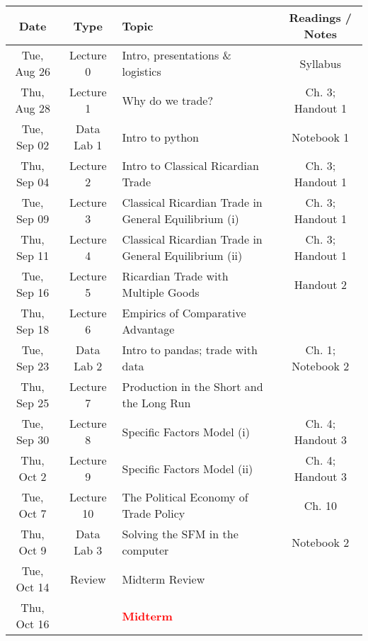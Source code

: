 \documentclass[11pt]{article}
\begin{document}
\medskip
\begin{center}
\begin{tabular}{|c|c|l|c|}
\hline \textbf{Date} & \textbf{Type} & \textbf{Topic} & \textbf{Readings / Notes} \\ \hline
			
		Tue, Aug 26 & Lecture 0 & Intro, presentations \& logistics & Syllabus \\ \hline
		Thu, Aug 28 & Lecture 1  & Why do we trade? & Ch. 3; Handout 1 \\ \hline
		Tue, Sep 02 & Data Lab 1 & Intro to python & Notebook 1 \\ \hline
	    Thu, Sep 04 &Lecture 2 & Intro to Classical Ricardian Trade & Ch. 3; Handout 1 \\ \hline	
		Tue, Sep 09 & Lecture 3 & Classical Ricardian Trade in General Equilibrium (i) & Ch. 3; Handout 1 \\ \hline
		Thu, Sep 11 & Lecture 4 & Classical Ricardian Trade in General Equilibrium (ii) & Ch. 3; Handout 1 \\ \hline
		Tue, Sep 16 & Lecture 5 & Ricardian Trade with Multiple Goods & Handout 2 \\ \hline
		
		Thu, Sep 18 & Lecture 6 & Empirics of Comparative Advantage &  \textemdash  \\ \hline

		Tue, Sep 23 & Data Lab 2 & Intro to pandas; trade with data & Ch. 1; Notebook 2 \\ \hline

  	Thu, Sep 25 &  Lecture 7 & Production in the Short and the Long Run & \textemdash \\ \hline

        Tue, Sep 30 &  Lecture 8 & Specific Factors Model (i) & Ch. 4; Handout 3  \\ \hline

        Thu, Oct 2 &  Lecture 9 & Specific Factors Model (ii) & Ch. 4; Handout 3 \\ \hline

        Tue, Oct 7 & Lecture 10 & The Political Economy of Trade Policy &  Ch. 10 \\ \hline

        Thu, Oct 9 &Data Lab 3 & Solving the SFM in the computer & Notebook 2 \\ \hline

        Tue, Oct 14 & Review & Midterm Review  &   \\ \hline
        Thu, Oct 16 &  & \textcolor{red}{\textbf{Midterm}} &   \\ \hline
		

\end{tabular}
\end{center}
\end{document}
